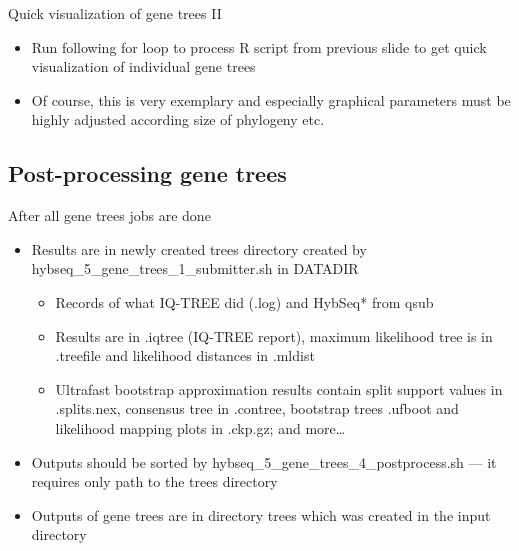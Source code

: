\documentclass[compress,  xelatex, 11pt, xcolor=x11names, aspectratio=169,
	hyperref={
		bookmarks=true,
		unicode=true,
		colorlinks=true,
		pdftitle={HybSeq course},
		plainpages=false,
		pdfauthor={Vojtech Zeisek},
		pdfsubject={Practical processing of HybSeq target enrichment sequencing data on computing grids like MetaCentrum},
		pdfcreator={XeLaTeX},
		pdfkeywords={BASH, command line, GNU, HybSeq, Linux, MetaCentrum, sequencing shell, target enrichment},
		linkcolor=Turquoise4, %
		anchorcolor=DodgerBlue4, %
		citecolor=DodgerBlue4, %
		filecolor=DodgerBlue4, %
		menucolor=Tan4, %
		urlcolor=DarkOliveGreen4 %
		},
	url={hyphens, lowtilde} %
	]{beamer}
\renewcommand{\texttt}[1]{\colorbox{Cornsilk2}{{\ttfamily #1}}}
\begin{document}
\begin{frame}[fragile]{Quick visualization of gene trees II}
	\begin{itemize}
		\item Run following \texttt{for} loop to process \texttt{R} script from previous slide to get quick visualization of individual gene trees
		\item Of course, this is very exemplary and especially graphical parameters must be highly adjusted according size of phylogeny etc.
	\end{itemize}
\end{frame}

\subsection{Post-processing gene trees}

\begin{frame}{After all gene trees jobs are done}
	\begin{itemize}
		\item Results are in newly created \texttt{trees} directory created by \texttt{hybseq\_5\_gene\_trees\_1\_submitter.sh} in \texttt{DATADIR}
		\begin{itemize}
			\item Records of what IQ-TREE did (\texttt{*.log}) and \texttt{HybSeq*} from \texttt{qsub}
			\item Results are in \texttt{*.iqtree} (IQ-TREE report), maximum likelihood tree is in \texttt{*.treefile} and likelihood distances in \texttt{*.mldist}
			\item Ultrafast bootstrap approximation results contain split support values in \texttt{*.splits.nex}, consensus tree in \texttt{*.contree}, bootstrap trees \texttt{*.ufboot} and likelihood mapping plots in \texttt{*.ckp.gz}; and more\ldots
		\end{itemize}
		\item Outputs should be sorted by \texttt{hybseq\_5\_gene\_trees\_4\_postprocess.sh} --- it requires only path to the \texttt{trees} directory
		\item Outputs of gene trees are in directory \texttt{trees} which was created in the input directory
	\end{itemize}
\end{frame}
\end{document}
